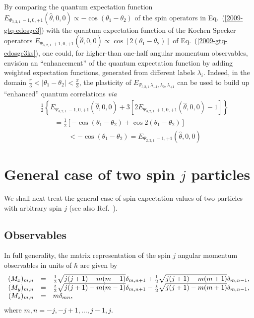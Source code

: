 \documentclass[pra,amsfonts,showpacs,showkeys,preprint]{revtex4}
\begin{document}
By comparing the quantum expectation function
$E_{{ \Psi_{3,2,1}}\,-1, 0, +1 } ({\hat \theta},0,0 )\propto - \cos (\theta_1 - \theta_2)$
of the spin operators in Eq.~(\ref{2009-gtq-edosgc3})
with the quantum expectation function  of the Kochen Specker operators
$E_{{ \Psi_{3,2,1}}\,+1, 0, +1 } ({\hat \theta},0,0 ) \propto
\cos \left[2 ( \theta_1 - \theta_2 )\right]$
of Eq.~(\ref{2009-gtq-edosgc3ks}),
one could, for higher-than one-half angular momentum observables, envision an ``enhancement'' of the quantum expectation function
by adding weighted expectation functions, generated from different labels $\lambda_i$.
Indeed, in the domain $\frac{\pi }{3}< | \theta_1 -\theta_2 | < \frac{\pi }{3}$,
the plasticity of
$E_{{ \Psi_{l,2,1}}\,\lambda_{-1},  \lambda_{0} , \lambda_{+1} }$
can be used to build up ``enhanced'' quantum correlations {\it via}
\begin{equation}
\begin{array}{rcl}
&&\frac{1}{2}\left\{
E_{{ \Psi_{3,2,1}}\,-1, 0, +1 } ({\hat \theta},0,0 )
+
3\left[2 E_{{ \Psi_{3,2,1}}\,+1, 0, +1 } ({\hat \theta},0,0 ) -1\right]\right\}
\\
&&\qquad =  \frac{1}{2}\left[-\cos (\theta_1 -\theta_2 ) + \cos 2 (\theta_1 -\theta_2 )
\right]
\\
&& \qquad \qquad
< -\cos (\theta_1 -\theta_2 ) =  E_{{ \Psi_{2,2,1}}\,-1, +1 } ({\hat \theta},0,0 )
\end{array}
\label{2009-gtq-eqcs3}
\end{equation}



\section{General case of two spin $j$ particles}

We shall next treat the general case of spin expectation values of two particles with arbitrary spin $j$ (see also Ref.~\cite{svozil-krenn}).

\subsection{Observables}

In full generality, the matrix representation of the spin $j$ angular momentum observables in units of $\hbar$ are given by
\begin{equation}
\begin{array}{rcl}
(M_x)_{m,n}&=&
{1\over 2}\sqrt{j(j+1)-m(m-1)}\delta_{m,n+1} + {1\over 2}\sqrt{j(j+1)-m(m+1)}\delta_{m,n-1},\\
(M_y)_{m,n}&=&
{i\over 2}\sqrt{j(j+1)-m(m-1)}\delta_{m,n+1} -{i\over 2}\sqrt{j(j+1)-m(m+1)}\delta_{m,n-1},\\
(M_z)_{m,n}&=&m\delta_{mn},
\end{array}
\end{equation}
where $m,n=-j,-j+1,\ldots ,j-1,j$.
\end{document}
